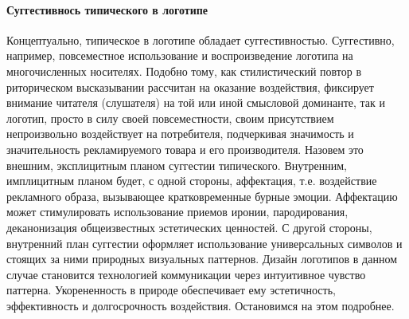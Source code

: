 \paragraph{Суггестивнось типического в логотипе}
Концептуально, типическое в логотипе обладает суггестивностью. Суггестивно,
например, повсеместное использование и воспроизведение логотипа на
многочисленных носителях. Подобно тому, как стилистический повтор в риторическом
высказывании рассчитан на оказание воздействия, фиксирует внимание
читателя (слушателя) на той или иной смысловой доминанте, так и логотип,
просто в силу своей повсеместности, своим присутствием непроизвольно
воздействует на потребителя, подчеркивая значимость и значительность
рекламируемого товара и его производителя. Назовем это внешним, эксплицитным
планом суггестии типического. Внутренним, имплицитным планом будет, с одной
стороны, аффектация, т.е. воздействие рекламного образа, вызывающее
кратковременные бурные эмоции. Аффектацию может стимулировать использование
приемов иронии, пародирования, деканонизация общеизвестных эстетических
ценностей. С другой стороны, внутренний план суггестии оформляет  использование
универсальных символов и стоящих за ними природных визуальных паттернов.
Дизайн логотипов в данном случае становится технологией коммуникации через
интуитивное чувство паттерна. Укорененность в природе обеспечивает ему
эстетичность, эффективность и долгосрочность воздействия.\autocite[][9]{macnab2008decoding} Остановимся
на этом подробнее.

